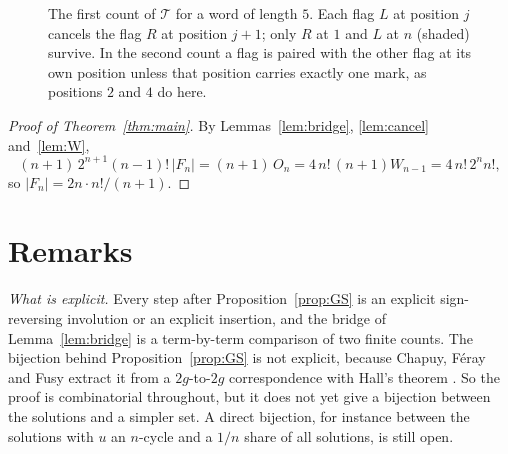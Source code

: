 \documentclass[11pt]{amsart}
\theoremstyle{remark}
\begin{document}
\begin{figure}[ht]
\centering
{}
\caption{The first count of $\mathcal T$ for a word of length $5$. Each flag $L$ at position $j$ cancels the flag
$R$ at position $j+1$; only $R$ at $1$ and $L$ at $n$ (shaded) survive. In the second count a flag is paired with the
other flag at its own position unless that position carries exactly one mark, as positions $2$ and $4$ do here.}
\label{fig:telescope}
\end{figure}

\begin{proof}[Proof of Theorem~\ref{thm:main}]
By Lemmas~\ref{lem:bridge}, \ref{lem:cancel} and~\ref{lem:W},
\[
  (n+1)\,2^{n+1}(n-1)!\,|F_n|=(n+1)\,O_n=4\,n!\,(n+1)W_{n-1}=4\,n!\,2^n n!,
\]
so $|F_n|=2n\cdot n!/(n+1)$.
\end{proof}

\section{Remarks}\label{sec:remarks}

\emph{What is explicit.} Every step after Proposition~\ref{prop:GS} is an explicit sign-reversing involution or an
explicit insertion, and the bridge of Lemma~\ref{lem:bridge} is a term-by-term comparison of two finite counts. The
bijection behind Proposition~\ref{prop:GS} is not explicit, because Chapuy, F\'eray and Fusy extract it from a
$2g$-to-$2g$ correspondence with Hall's theorem \cite[\S2.4--2.5]{CFF}. So the proof is combinatorial throughout, but
it does not yet give a bijection between the solutions and a simpler set. A direct bijection, for instance between
the solutions with $u$ an $n$-cycle and a $1/n$ share of all solutions, is still open.
\end{document}
